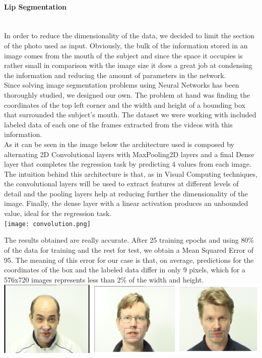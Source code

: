 \documentclass{article}[10pt]
\begin{document}
\begin{multicols}{2}
\paragraph{Lip Segmentation} ~\\

In order to reduce the dimensionality of the data, we decided to limit the
section of the photo used as input. Obviously, the bulk of the
information stored in an image comes from the mouth of the subject and since the
space it occupies is rather small in comparison with the image size it does a
great job at condensing the information and reducing the amount of parameters in
the network.\\

Since solving image segmentation problems using Neural Networks has been
thoroughly studied, we designed our own. The problem at hand was finding the
coordinates of the top left corner and the width and height of a bounding box
that surrounded the subject's mouth. The dataset we were working with included
labeled data of each one of the frames extracted from the videos with this
information. \\

As it can be seen in the image below the architecture used is composed by alternating
2D Convolutional layers with MaxPooling2D layers and a final Dense layer that
completes the regression task by predicting 4 values from each image. The
intuition behind this architecture is that, as in Visual Computing techniques,
the convolutional layers will be used to extract features at different levels of
detail and the pooling layers help at reducing further the dimensionality of the
image. Finally, the dense layer with a linear activation produces an unbounded
value, ideal for the regression task.\\

\noindent\texttt{[image: convolution.png]}

The results obtained are really accurate. After 25 training epochs and using 80\%
of the data for training and the rest for test, we obtain a Mean Squared Error of
95. The meaning of this error for our case is that, on average, predictions
for the coordinates of the box and the labeled data differ in only 9 pixels, which
for a 576x720 images represents less than 2\% of the width and height.\\

\noindent\includegraphics[width=\linewidth, keepaspectratio]{boxes.png}


\end{multicols}
\end{document}
